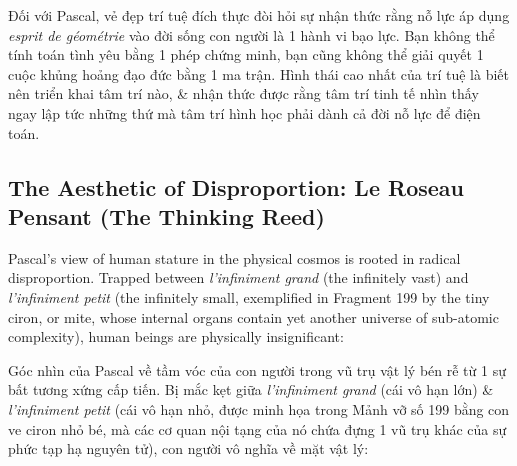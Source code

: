 \documentclass[11pt]{article}
\begin{document}
Đối với Pascal, vẻ đẹp trí tuệ đích thực đòi hỏi sự nhận thức rằng nỗ lực áp dụng \textit{esprit de g\'eom\'etrie} vào đời sống con người là 1 hành vi bạo lực. Bạn không thể tính toán tình yêu bằng 1 phép chứng minh, bạn cũng không thể giải quyết 1 cuộc khủng hoảng đạo đức bằng 1 ma trận. Hình thái cao nhất của trí tuệ là biết nên triển khai tâm trí nào, \& nhận thức được rằng tâm trí tinh tế nhìn thấy ngay lập tức những thứ mà tâm trí hình học phải dành cả đời nỗ lực để điện toán.

\subsection{The Aesthetic of Disproportion: Le Roseau Pensant (The Thinking Reed)}
Pascal's view of human stature in the physical cosmos is rooted in radical disproportion. Trapped between \textit{l'infiniment grand} (the infinitely vast) and \textit{l'infiniment petit} (the infinitely small, exemplified in Fragment 199 by the tiny ciron, or mite, whose internal organs contain yet another universe of sub-atomic complexity), human beings are physically insignificant:

Góc nhìn của Pascal về tầm vóc của con người trong vũ trụ vật lý bén rễ từ 1 sự bất tương xứng cấp tiến. Bị mắc kẹt giữa \textit{l'infiniment grand} (cái vô hạn lớn) \& \textit{l'infiniment petit} (cái vô hạn nhỏ, được minh họa trong Mảnh vỡ số 199 bằng con ve ciron nhỏ bé, mà các cơ quan nội tạng của nó chứa đựng 1 vũ trụ khác của sự phức tạp hạ nguyên tử), con người vô nghĩa về mặt vật lý:
\end{document}

